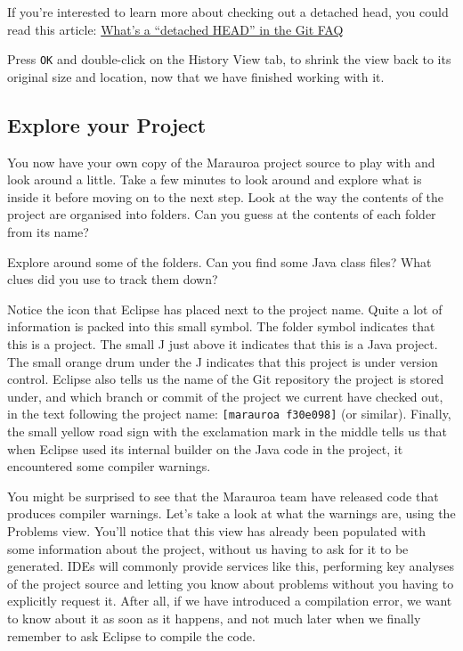 \documentclass[
]{book}
\begin{document}
If you're interested to learn more about checking out a detached head, you could read this article: \href{https://www.git-tower.com/learn/git/faq/detached-head-when-checkout-commit}{What's a ``detached HEAD'' in the Git FAQ}

Press \texttt{OK} and double-click on the History View tab, to shrink the view back to its original size and location, now that we have finished working with it.

\hypertarget{explore}{%
\subsection{Explore your Project}\label{explore}}

You now have your own copy of the Marauroa project source to play with and look around a little. Take a few minutes to look around and explore what is inside it before moving on to the next step. Look at the way the contents of the project are organised into folders. Can you guess at the contents of each folder from its name?

Explore around some of the folders. Can you find some Java class files? What clues did you use to track them down?

Notice the icon that Eclipse has placed next to the project name. Quite a lot of information is packed into this small symbol. The folder symbol indicates that this is a project. The small J just above it indicates that this is a Java project. The small orange drum under the J indicates that this project is under version control. Eclipse also tells us the name of the Git repository the project is stored under, and which branch or commit of the project we current have checked out, in the text following the project name: \texttt{{[}marauroa\ f30e098{]}} (or similar). Finally, the small yellow road sign with the exclamation mark in the middle tells us that when Eclipse used its internal builder on the Java code in the project, it encountered some compiler warnings.

You might be surprised to see that the Marauroa team have released code that produces compiler warnings. Let's take a look at what the warnings are, using the Problems view. You'll notice that this view has already been populated with some information about the project, without us having to ask for it to be generated. IDEs will commonly provide services like this, performing key analyses of the project source and letting you know about problems without you having to explicitly request it. After all, if we have introduced a compilation error, we want to know about it as soon as it happens, and not much later when we finally remember to ask Eclipse to compile the code.
\end{document}
